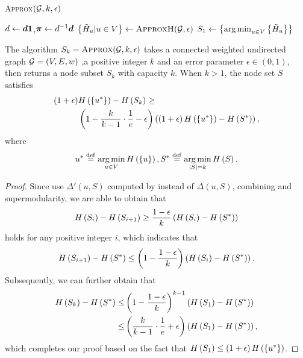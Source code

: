 \documentclass[sigconf]{acmart}
\begin{document}
\begin{algorithm}
    \caption{\textsc{Approx}\((\mathcal{G},k,\epsilon)\)}
    \label{algo:approx}
    \(d\gets\boldsymbol{d}\boldsymbol{1}\),\(\boldsymbol{\pi}\gets d^{-1}\boldsymbol{d}\)\;
    \(\left\{\tilde{H}_u|u\in V  \right\}\gets\textsc{ApproxH}(\mathcal{G},\epsilon)\)\;
    \(S_1\gets\left\{\operatorname*{arg\,min}_{u\in V}\left\{\tilde{H}_u \right\} \right\}\)\;
\end{algorithm}

\begin{theorem}
    The algorithm \(S_k=\textsc{Approx}(\mathcal{G},k,\epsilon)\) takes a connected weighted undirected graph \(\mathcal{G}=(V,E,w)\) ,a positive integer \(k\) and an error parameter \(\epsilon\in(0,1)\), then returns a node subset \(S_k\) with capacity \(k\). When \(k>1\), the node set \(S\) satisfies
    \begin{align*}
        \left( 1+\epsilon \right) & H\left(\left\{u^* \right\}\right)-H\left(S_k\right)\ge                                                                         \\
                           & \left( 1-\frac{k}{k-1}\cdot\frac{1}{e}-\epsilon \right)\left( \left( 1+\epsilon \right)H\left(\left\{u^* \right\}\right)-H\left(S^*\right) \right),
    \end{align*}
    where
    \[u^*\stackrel{\mathrm{def}}{=}\operatorname*{arg\,min}_{u\in V}H\left(\left\{u \right\}\right),S^*\stackrel{\mathrm{def}}{=}\operatorname*{arg\,min}_{\left|S \right|=k}H\left(S\right).\]
\end{theorem}
\begin{proof}
    Since  use \(\Delta'(u,S)\) computed by  instead of \(\Delta(u,S)\), combining  and supermodularity, we are able to obtain that
    \[H\left(S_i\right)-H\left(S_{i+1}\right)\ge\frac{1-\epsilon}{k}\left( H\left(S_i\right)-H\left(S^*\right) \right)\]
    holds for any positive integer \(i\), which indicates that
    \[H\left(S_{i+1}\right)-H\left(S^*\right)\le\left( 1-\frac{1-\epsilon}{k} \right)\left( H\left(S_i\right)-H\left(S^*\right) \right).\]
    Subsequently, we can further obtain that
    \begin{align*}
        H\left(S_k\right)-H\left(S^*\right) \le & \left( 1-\frac{1-\epsilon}{k} \right)^{k-1}\left( H\left(S_1\right)-H\left(S^*\right) \right)            \\
        \le                       & \left( \frac{k}{k-1}\cdot\frac{1}{e}+\epsilon \right)\left( H\left(S_1\right)-H\left(S^*\right) \right),
    \end{align*}
    which completes our proof based on the fact that \(H\left(S_1\right)\le\left( 1+\epsilon \right)H\left(\left\{u^* \right\}\right)\).
\end{proof}
\end{document}
